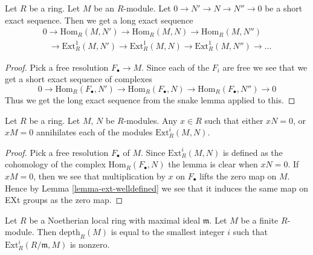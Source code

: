 \begin{lemma}
\label{lemma-long-exact-seq-ext}
Let $R$ be a ring. Let $M$ be an $R$-module.
Let $0 \to N' \to N \to N'' \to 0$ be a
short exact sequence. Then we get a long exact
sequence
$$
\begin{matrix}
0
\to \text{Hom}_R(M, N')
\to \text{Hom}_R(M, N)
\to \text{Hom}_R(M, N'')
\\
\phantom{0\ }
\to \text{Ext}^1_R(M, N')
\to \text{Ext}^1_R(M, N)
\to \text{Ext}^1_R(M, N'')
\to \ldots
\end{matrix}
$$
\end{lemma}

\begin{proof}
Pick a free resolution $F_{\bullet} \to M$.
Since each of the $F_i$ are free we see that
we get a short exact sequence of complexes
$$
0 \to
\text{Hom}_R(F_{\bullet}, N') \to
\text{Hom}_R(F_{\bullet}, N) \to
\text{Hom}_R(F_{\bullet}, N'') \to
0
$$
Thus we get the long exact sequence from
the snake lemma applied to this.
\end{proof}

\begin{lemma}
\label{lemma-annihilate-ext}
Let $R$ be a ring. Let $M$, $N$ be $R$-modules.
Any $x\in R$ such that either $xN = 0$, or $xM = 0$
annihilates each of the modules $\text{Ext}^i_R(M, N)$.
\end{lemma}

\begin{proof}
Pick a free resolution $F_{\bullet}$ of $M$.
Since $\text{Ext}^i_R(M, N)$
is defined as the cohomology of the complex
$\text{Hom}_R(F_{\bullet}, N)$ the lemma is
clear when $xN = 0$. If $xM = 0$, then
we see that multiplication by $x$ on $F_{\bullet}$
lifts the zero map on $M$. Hence by Lemma
\ref{lemma-ext-welldefined} we see that it
induces the same map on EXt groups as the
zero map.
\end{proof}

\begin{lemma}
\label{lemma-depth-ext}
Let $R$ be a Noetherian local ring with maximal ideal $\mathfrak m$.
Let $M$ be a finite $R$-module. Then $\text{depth}_R(M)$
is equal to the smallest integer $i$ such that
$\text{Ext}^i_R(R/\mathfrak m, M)$ is nonzero.
\end{lemma}

